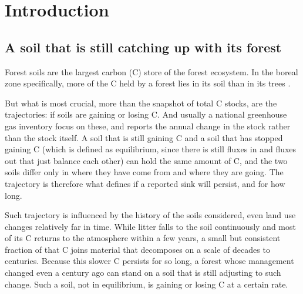 \documentclass[11pt]{article}
\begin{document}
\section{Introduction}

\subsection{A soil that is still catching up with its forest}

Forest soils are the largest carbon (C) store of the forest ecosystem. In the boreal
zone specifically, more of the C held by a forest lies in its soil than in its trees
\citep{Pan2011}. 

But what is most crucial, more than the snapshot of total C stocks, are the trajectories: if soils are gaining or losing C. And usually a national greenhouse gas inventory focus on these, and reports the annual change in the stock rather than the stock itself.  A soil that is still gaining C and a soil that has stopped gaining C (which is defined as equilibrium, since there is still fluxes in and fluxes out that just balance each other) can hold the same amount of C, and the two soils differ only in where they have come from and where they are going. The trajectory is therefore what defines if a reported sink will persist, and for how long.

Such trajectory is influenced by the history of the soils considered, even land use changes relatively far in time. While litter falls to the soil continuously and most of its C returns to the atmosphere within a few years, a small but consistent fraction of that C joins material that decomposes on a scale of decades to centuries. Because this slower C persists for so long, a forest whose management changed even a century ago can stand on a soil that is still adjusting to such change.
Such a soil, not in equilibrium, is gaining or losing C at a certain rate.
\end{document}
